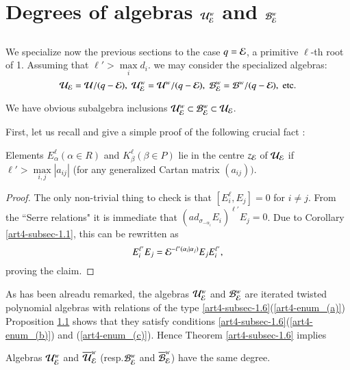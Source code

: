 \section{Degrees of algebras $\mathcal{U}_{\mathcal{E}}^{w}$ and $\mathcal{B}_{\mathcal{E}}^{w}$}\label{art4-sec-3}

\subsection{}\label{art4-subsec-3.1}
We specialize now the previous sections to the case $q=\mathcal{E}$, a primitive $\ell$-th root of 1. Assuming that $\ell' > \max\limits_{i} d_{i}$. we may consider the specialized algebras:
$$
\mathcal{U}_{\mathcal{E}} = \mathcal{U}/(q-\mathcal{E}), \; \mathcal{U}_{\mathcal{E}}^{w} = \mathcal{U}^{w}/(q-\mathcal{E}), \; \mathcal{B}_{\mathcal{E}}^{w} = \mathcal{B}^{w}/(q-\mathcal{E}), \;{\rm etc}.
$$

\noindent
We have obvious subalgebra inclusions $\mathcal{U}_{\mathcal{E}}^{w} \subset \mathcal{B}_{\mathcal{E}}^{w} \subset \mathcal{U}_{\mathcal{E}}$.

First, let us recall and give a simple proof of the following crucial fact \cite{art4-keyDK1}:

\begin{prop*}
Elements $E_{\alpha}^{\ell}(\alpha \in R)$ and $K_{\beta}^{\ell}(\beta\in P)$ lie in the centre $z_{\mathcal{E}}$ of $\mathcal{U}_{\mathcal{E}}$ if $\ell'> \max\limits_{i,j} |a_{ij}|$ (for any generalized Cartan matrix $(a_{ij}))$.
\end{prop*}

\begin{proof}
The only non-trivial thing to check is that $[E_{i}^\ell, E_{j}]= 0$ for $i \neq j$. From the ``Serre relations" it is immediate that $(ad_{\sigma_{-\alpha_{i}}}E_{i})^{\ell'}E_{j} =0$. Due to Corollary \ref{art4-subsec-1.1}, this can be rewritten as
$$
E_{i}^{\ell'}E_{j}=\mathcal{E}^{-\ell'(\alpha_{i} | \alpha_{j})}E_{j}E_{i}^{\ell'},
$$
proving the claim. 
\end{proof}

As has been alreadu remarked, the algebras $\mathcal{U}_{\mathcal{E}}^{w}$ and $\mathcal{B}_{\mathcal{E}}^{w}$ are iterated twisted polynomial algebras with relations of the type \ref{art4-subsec-1.6}(\ref{art4-enum_(a)}) Proposition \ref{art4-subsec-3.1} shows that they satisfy conditions \ref{art4-subsec-1.6}(\ref{art4-enum_(b)}) and (\ref{art4-enum_(c)}). Hence Theorem \ref{art4-subsec-1.6} implies

\begin{coro*}
Algebras $\mathcal{U}_{\mathcal{E}}^{w}$ and $\overline{\mathcal{U}}_{\mathcal{E}}^{w}$ (resp.$\mathcal{B}_{\mathcal{E}}^{w}$ and $\overline{\mathcal{B}}_{\mathcal{E}}^{w}$) have the same degree.
\end{coro*}

